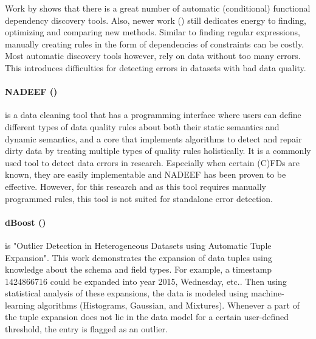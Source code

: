 Work by \cite{Asghar2015-yq} shows that there is a great number of automatic (conditional) functional dependency discovery tools. Also, newer work (\cite{Rammelaere2019-ps}) still dedicates energy to finding, optimizing and comparing new methods. Similar to finding regular expressions, manually creating rules in the form of dependencies of constraints can be costly. Most automatic discovery tools however, rely on data without too many errors. This introduces difficulties for detecting errors in datasets with bad data quality. 

\paragraph{NADEEF (\cite{Dallachiesa2013-he})} is a data cleaning tool that has a programming interface where users can define different types of data quality rules about both their static semantics and dynamic semantics, and a core that implements algorithms to detect and repair dirty data by treating multiple types of quality rules holistically. It is a commonly used tool to detect data errors in research. Especially when certain (C)FDs are known, they are easily implementable and NADEEF has been proven to be effective. However, for this research and as this tool requires manually programmed rules, this tool is not suited for standalone error detection.


\paragraph{dBoost (\cite{Pit--Claudel2016-dj})} is "Outlier Detection in Heterogeneous Datasets using Automatic Tuple Expansion". This work demonstrates the expansion of data tuples using knowledge about the schema and field types. For example, a \mbox{timestamp} 1424866716 could be expanded into year 2015, Wednesday, etc.. Then using statistical analysis of these expansions, the data is modeled using machine-learning algorithms (Histograms, Gaussian, and Mixtures). Whenever a part of the tuple expansion does not lie in the data model for a certain user-defined threshold, the entry is flagged as an outlier.



